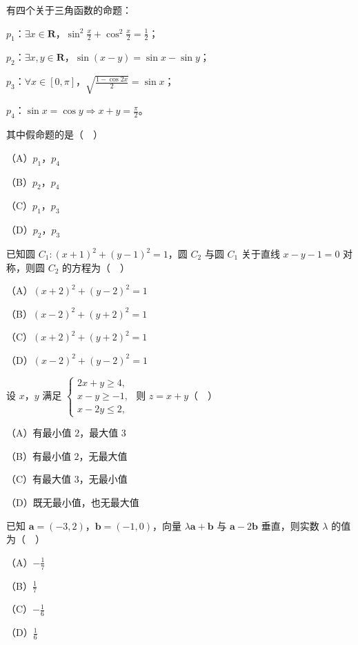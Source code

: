 \begin{question}
有四个关于三角函数的命题：

$p_1$：$\exists x\in\mathbf R$，$\sin^2\frac x2+\cos^2\frac x2=\frac12$；

$p_2$：$\exists x,y\in\mathbf R$，$\sin(x-y)=\sin x-\sin y$；

$p_3$：$\forall x\in[0,\pi]$，$\sqrt{\frac{1-\cos2x}{2}}=\sin x$；

$p_4$：$\sin x=\cos y\Rightarrow x+y=\frac{\pi}{2}$。

其中假命题的是（　）

（A）$p_1$，$p_4$

（B）$p_2$，$p_4$

（C）$p_1$，$p_3$

（D）$p_2$，$p_3$

\end{question}
\begin{question}
已知圆 $C_1:(x+1)^2+(y-1)^2=1$，圆 $C_2$ 与圆 $C_1$ 关于直线 $x-y-1=0$ 对称，则圆 $C_2$ 的方程为（　）

（A）$(x+2)^2+(y-2)^2=1$

（B）$(x-2)^2+(y+2)^2=1$

（C）$(x+2)^2+(y+2)^2=1$

（D）$(x-2)^2+(y-2)^2=1$

\end{question}
\begin{question}
设 $x$，$y$ 满足 $\begin{cases}2x+y\geqslant4,\\ x-y\geqslant-1,\\ x-2y\leqslant2,\end{cases}$ 则 $z=x+y$（　）

（A）有最小值 $2$，最大值 $3$

（B）有最小值 $2$，无最大值

（C）有最大值 $3$，无最小值

（D）既无最小值，也无最大值

\end{question}
\begin{question}
已知 $\boldsymbol a=(-3,2)$，$\boldsymbol b=(-1,0)$，向量 $\lambda\boldsymbol a+\boldsymbol b$ 与 $\boldsymbol a-2\boldsymbol b$ 垂直，则实数 $\lambda$ 的值为（　）

（A）$-\frac17$

（B）$\frac17$

（C）$-\frac16$

（D）$\frac16$

\end{question}

